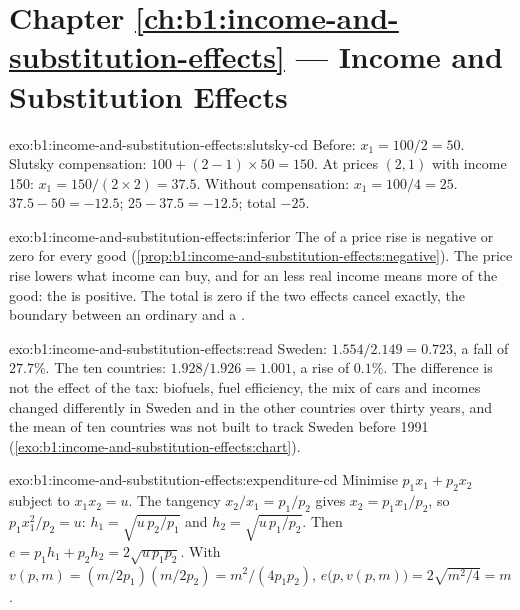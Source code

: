 \section*{Chapter \ref{ch:b1:income-and-substitution-effects} --- Income and Substitution Effects}

\begin{solution}{exo:b1:income-and-substitution-effects:slutsky-cd}
Before: $x_1 = 100/2 = 50$. Slutsky compensation: $100 + (2 - 1) \times 50 = 150$.
At prices $(2, 1)$ with income 150: $x_1 = 150/(2 \times 2) = 37.5$. Without
compensation: $x_1 = 100/4 = 25$.  $37.5 - 50 = -12.5$;
 $25 - 37.5 = -12.5$; total $-25$.
\end{solution}

\begin{solution}{exo:b1:income-and-substitution-effects:inferior}
The  of a price rise is negative or zero for every good
(\cref{prop:b1:income-and-substitution-effects:negative}). The price rise
lowers what income can buy, and for an  less real income means
more of the good: the  is positive. The total is zero if the
two effects cancel exactly, the boundary between an ordinary and a .
\end{solution}

\begin{solution}{exo:b1:income-and-substitution-effects:read}
Sweden: $1.554/2.149 = 0.723$, a fall of $27.7\%$. The ten countries:
$1.928/1.926 = 1.001$, a rise of $0.1\%$. The difference is not the effect
of the tax: biofuels, fuel efficiency, the mix of cars and incomes changed
differently in Sweden and in the other countries over thirty years, and the
mean of ten countries was not built to track Sweden before 1991
(\cref{exo:b1:income-and-substitution-effects:chart}).
\end{solution}

\begin{solution}{exo:b1:income-and-substitution-effects:expenditure-cd}
Minimise $p_1x_1 + p_2x_2$ subject to $x_1x_2 = u$. The tangency
$x_2/x_1 = p_1/p_2$ gives $x_2 = p_1x_1/p_2$, so $p_1x_1^2/p_2 = u$:
$h_1 = \sqrt{u\,p_2/p_1}$ and $h_2 = \sqrt{u\,p_1/p_2}$. Then
$e = p_1h_1 + p_2h_2 = 2\sqrt{u\,p_1p_2}$. With $v(p, m) = (m/2p_1)(m/2p_2) = m^2/(4p_1p_2)$,
$e\bigl(p, v(p, m)\bigr) = 2\sqrt{m^2/4} = m$.
\end{solution}

